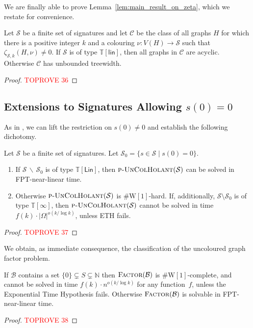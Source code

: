 \documentclass[authorcolumns,numberwithinsect]{no-lipics-v2022}
\newcommand{\W}{\mathrm{W}}
\begin{document}
We are finally able to prove Lemma~\ref{lem:main_result_on_zeta}, which we restate for convenience.
\begin{lemma}
    Let $\mathcal{S}$ be a finite set of signatures and let $\mathcal{C}$ be the class of all graphs $H$ for which there is a positive integer $k$ and a colouring $\nu:V(H)\to \mathcal{S}$ such that $\zeta_{\mathcal{S},k}(H,\nu)\neq 0$. If $\mathcal{S}$ is of type $\mathbb{T}[\mathsf{lin}]$, then all graphs in $\mathcal{C}$ are acyclic. Otherwise $\mathcal{C}$ has unbounded treewidth.
\end{lemma}
\begin{proof}\textcolor{red}{TOPROVE 36}\end{proof}


\subsection{Extensions to Signatures Allowing $s(0) = 0$}
As in , we can lift the restriction on $s(0) \neq 0$ and establish the following dichotomy.

\begin{theorem}
Let $\mathcal{S}$ be a finite set of signatures. Let $\mathcal{S}_0 = \{s \in \mathcal{S} \mid s(0) = 0\}$. 
\begin{enumerate}
\item If $\mathcal{S}\,\backslash\, \mathcal{S}_0$ is of type $\mathbb{T}[\mathsf{Lin}]$, then $\text{\sc{p-UnColHolant}}(\mathcal{S})$ can be solved in FPT-near-linear time.
\item Otherwise $\text{\sc{p-UnColHolant}}(\mathcal{S})$ is $\#\mathrm{W}[1]$-hard. If, additionally, $\mathcal{S}\setminus \mathcal{S}_0$ is of type $\mathbb{T}[\infty]$, then $\text{\sc{p-UnColHolant}}(\mathcal{S})$ cannot be solved in time $f(k)\cdot |\Omega|^{o(k/\log k)}$, unless ETH fails.
\end{enumerate}
\end{theorem}
\begin{proof}\textcolor{red}{TOPROVE 37}\end{proof}

We obtain, as immediate consequence, the classification of the uncoloured graph factor problem.
\begin{corollary}\label{cor:factor_classification_uncol}
    If $\mathcal{B}$ contains a set $\{0\} \subsetneq S \subsetneq \mathbb{N}$ then $\textsc{Factor}(\mathcal{B})$ is $\#\W[1]$-complete, and cannot be solved in time $f(k)\cdot n^{o(k/\log k)}$ for any function~$f$, unless the Exponential Time Hypothesis fails. Otherwise $\textsc{Factor}(\mathcal{B})$ is solvable in FPT-near-linear time.
\end{corollary}
\begin{proof}\textcolor{red}{TOPROVE 38}\end{proof}
\end{document}
